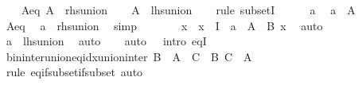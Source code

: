 \begin{isabellebody}
\isanewline
\ \ \isamarkupfalse%
\ A{\isacharunderscore}{\kern0pt}eq{\isacharcolon}{\kern0pt}\ {\isachardoublequoteopen}A\ {\isacharequal}{\kern0pt}\ {\isacharquery}{\kern0pt}rhs{\isacharunderscore}{\kern0pt}union{\isachardoublequoteclose}\isanewline
\ \ \isamarkupfalse%
\ {\isachardoublequoteopen}A\ {\isasymsubseteq}\ {\isacharquery}{\kern0pt}lhs{\isacharunderscore}{\kern0pt}union{\isachardoublequoteclose}\isanewline
\ \ \isamarkupfalse%
\ {\isacharparenleft}{\kern0pt}rule\ subsetI{\isacharparenright}{\kern0pt}\isanewline
\ \ \ \ \isamarkupfalse%
\ a\ \isamarkupfalse%
\ {\isachardoublequoteopen}a\ {\isasymin}\ A{\isachardoublequoteclose}\isanewline
\ \ \ \ \isamarkupfalse%
\ A{\isacharunderscore}{\kern0pt}eq\ \isamarkupfalse%
\ {\isachardoublequoteopen}a\ {\isasymin}\ {\isacharquery}{\kern0pt}rhs{\isacharunderscore}{\kern0pt}union{\isachardoublequoteclose}\ \isamarkupfalse%
\ simp\isanewline
\ \ \ \ \isamarkupfalse%
\ \isamarkupfalse%
\ x\ \ {\isachardoublequoteopen}x\ {\isasymin}\ I{\isachardoublequoteclose}\ \ {\isachardoublequoteopen}a\ {\isasymin}\ A\ {\isasyminter}\ B\ x{\isachardoublequoteclose}\ \isamarkupfalse%
\ auto\isanewline
\ \ \ \ \isamarkupfalse%
\ \isamarkupfalse%
\ {\isachardoublequoteopen}a\ {\isasymin}\ {\isacharquery}{\kern0pt}lhs{\isacharunderscore}{\kern0pt}union{\isachardoublequoteclose}\ \isamarkupfalse%
\ auto\isanewline
\ \ \isamarkupfalse%
\isanewline
{}\isamarkupfalse%
\ {\isacharparenleft}{\kern0pt}auto\ {}\ {}\ intro{\isacharbang}{\kern0pt}{\isacharcolon}{\kern0pt}\ eqI{\isacharparenright}{\kern0pt}%
\endisatagproof
{\isafoldproof}%
%
\isadelimproof
\isanewline
%
\endisadelimproof
\isanewline
{}\isamarkupfalse%
\ bin{\isacharunderscore}{\kern0pt}inter{\isacharunderscore}{\kern0pt}union{\isacharunderscore}{\kern0pt}eq{\isacharunderscore}{\kern0pt}idx{\isacharunderscore}{\kern0pt}union{\isacharunderscore}{\kern0pt}inter{\isacharcolon}{\kern0pt}\ {\isachardoublequoteopen}{\isasymUnion}B\ {\isasyminter}\ A\ {\isacharequal}{\kern0pt}\ {\isacharparenleft}{\kern0pt}{\isasymUnion}C\ {\isasymin}\ B{\isachardot}{\kern0pt}\ C\ {\isasyminter}\ A{\isacharparenright}{\kern0pt}{\isachardoublequoteclose}\isanewline
%
\isadelimproof
\ \ %
\endisadelimproof
%
\isatagproof
{}\isamarkupfalse%
\ {\isacharparenleft}{\kern0pt}rule\ eq{\isacharunderscore}{\kern0pt}if{\isacharunderscore}{\kern0pt}subset{\isacharunderscore}{\kern0pt}if{\isacharunderscore}{\kern0pt}subset{\isacharparenright}{\kern0pt}\ auto%

\end{isabellebody}
